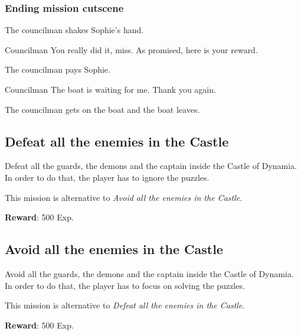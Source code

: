 \subsubsection*{Ending mission cutscene}
\begin{screenplay}

The councilman shakes Sophie's hand.

\begin{dialogue}[grateful]{Councilman}
You really did it, miss. As promised, here is your reward.
\end{dialogue}

The councilman pays Sophie.

\begin{dialogue}[continuing]{Councilman}
The boat is waiting for me. Thank you again.
\end{dialogue}

The councilman gets on the boat and the boat leaves.

\end{screenplay}


\subsection{Defeat all the enemies in the Castle}
Defeat all the guards, the demons and the captain inside the Castle of Dynamia. In order to do that, the player has to ignore the puzzles.

This mission is alternative to \textit{Avoid all the enemies in the Castle}.

\textbf{Reward}: 500 Exp.

\subsection{Avoid all the enemies in the Castle}
Avoid all the guards, the demons and the captain inside the Castle of Dynamia. In order to do that, the player has to focus on solving the puzzles.

This mission is alternative to \textit{Defeat all the enemies in the Castle}.

\textbf{Reward}: 500 Exp.


%
%
%
